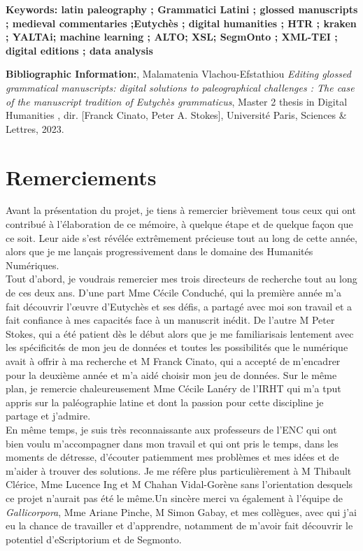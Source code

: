 \documentclass[a4paper, twoside, 12pt]{book}
\begin{document}
\medskip

\textbf{Keywords: latin paleography ; Grammatici Latini  ; glossed manuscripts ; medieval commentaries ;Eutychès ; digital humanities ; HTR ; kraken ; YALTAi; machine learning ; ALTO; XSL; SegmOnto ; XML-TEI ; digital editions ; data analysis}

\textbf{Bibliographic Information:}, Malamatenia Vlachou-Efstathiou \textit{Editing glossed grammatical manuscripts: digital solutions to paleographical challenges : The case of the manuscript tradition of Eutychès grammaticus}, Master 2 thesis in \og Digital Humanities \fg{}, dir. [Franck Cinato, Peter A. Stokes], Université Paris, Sciences \& Lettres, 2023.

\clearpage

\section*{Remerciements}

Avant la présentation du projet, je tiens à remercier brièvement tous ceux qui ont contribué à l'élaboration de ce mémoire, à quelque étape et de quelque façon que ce soit. Leur aide s'est révélée extrêmement précieuse tout au long de cette année, alors que je me lançais progressivement dans le domaine des Humanités Numériques.\\

Tout d'abord, je voudrais remercier mes trois directeurs de recherche tout au long de ces deux ans. D’une part Mme Cécile Conduché, qui la première année m'a fait découvrir l'œuvre d'Eutychès et ses défis, a partagé avec moi son travail et a fait confiance à mes capacités face à un manuscrit inédit. De l’autre M Peter Stokes, qui a été patient dès le début alors que je me familiarisais lentement avec les spécificités de mon jeu de données et toutes les possibilités que le numérique avait à offrir à ma recherche et M Franck Cinato, qui a accepté de m'encadrer pour la deuxième année et m'a aidé choisir mon jeu de données. Sur le même plan, je remercie chaleureusement Mme Cécile Lanéry de l'IRHT qui m'a tput appris sur la paléographie latine et dont la passion pour cette discipline je partage et j’admire. \\

 En même temps, je suis très reconnaissante aux professeurs de l'ENC qui ont bien voulu m'accompagner dans mon travail et qui ont pris le temps, dans les moments de détresse, d'écouter patiemment mes problèmes et mes idées et de m'aider à trouver des solutions. Je me réfère plus particulièrement à M  Thibault Clérice, Mme Lucence Ing et M Chahan Vidal-Gorène sans l'orientation desquels ce projet n'aurait pas été le même.Un sincère merci va également à l'équipe de \textit{Gallicorpora}, Mme Ariane Pinche, M  Simon Gabay, et mes collègues, avec qui j'ai eu la chance de travailler et d'apprendre, notamment de m'avoir fait découvrir le potentiel d'eScriptorium et de Segmonto. \\
\end{document}

